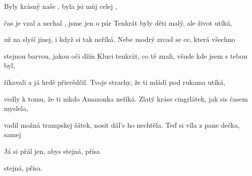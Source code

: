 
\zs
Byly krásný naše ,
{byla} jsi můj celej ,  

čas je vzal a nechal ,
 jsme jen o pár 
\ks
\zs
Tenkrát byly děti malý, ale život utíká,

už na  slyší jinej, i když si tak neříká.
\ks
\zr
Nebe modrý zrcad se ce, která všechno 

stejnou barvou, jakou   oči džín
\kr
\zs
Kluci tenkrát, co tě znali, všude kde jsem s tebou byl,

 říkavali a já hrdě přisvědčil.
\ks
\zs
Tvoje strachy, že ti mládí pod rukama utíká,

vedly k tomu, že ti nikdo Amazonka neříká.
\ks
\zr  \kr
\zs
Zlatý kráse cingrlátek,
jak sis časem myslela,

vadil možná trampskej šátek,
nosit dál's ho nechtěla.
\ks
\zs
Teď si víla z pane  dečka, samej 

Já si přál jen, abys   stejná, přísa

 stejná, přísa.
\ks
\zr \kr
\kp







